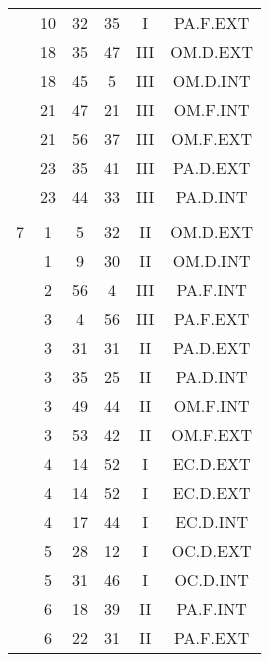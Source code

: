 \documentclass[12pt, a4paper]{article}
\begin{document}
\begin{multicols}{3}
{\begin{tabular}{c c c c c c}
	 	 	 	 & 10 & 32 & 35 & I & PA.F.EXT\\%
	 	 	 	 & 18 & 35 & 47 & III & OM.D.EXT\\%
	 	 	 	 & 18 & 45 & 5 & III & OM.D.INT\\%
	 	 	 	 & 21 & 47 & 21 & III & OM.F.INT\\%
	 	 	 	 & 21 & 56 & 37 & III & OM.F.EXT\\%
	 	 	 	 & 23 & 35 & 41 & III & PA.D.EXT\\%
	 	 	 	 & 23 & 44 & 33 & III & PA.D.INT\\%
	 	 	 	 & & & & & \\%
	 	 	 	7 & 1 & 5 & 32 & II & OM.D.EXT\\%
	 	 	 	 & 1 & 9 & 30 & II & OM.D.INT\\%
	 	 	 	 & 2 & 56 & 4 & III & PA.F.INT\\%
	 	 	 	 & 3 & 4 & 56 & III & PA.F.EXT\\%
	 	 	 	 & 3 & 31 & 31 & II & PA.D.EXT\\%
	 	 	 	 & 3 & 35 & 25 & II & PA.D.INT\\%
	 	 	 	 & 3 & 49 & 44 & II & OM.F.INT\\%
	 	 	 	 & 3 & 53 & 42 & II & OM.F.EXT\\%
	 	 	 	 & 4 & 14 & 52 & I & EC.D.EXT\\%
	 	 	 	 & 4 & 14 & 52 & I & EC.D.EXT\\%
	 	 	 	 & 4 & 17 & 44 & I & EC.D.INT\\%
	 	 	 	 & 5 & 28 & 12 & I & OC.D.EXT\\%
	 	 	 	 & 5 & 31 & 46 & I & OC.D.INT\\%
	 	 	 	 & 6 & 18 & 39 & II & PA.F.INT\\%
	 	 	 	 & 6 & 22 & 31 & II & PA.F.EXT\\%

\end{tabular}}
\end{multicols}
\end{document}

